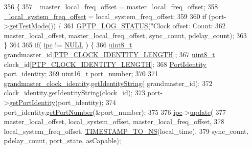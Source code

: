 \begin{DoxyCode}
356 \{
357     \hyperlink{class_i_e_e_e1588_clock_acaa18d3a0781792994fc1f34c8f43773}{\_master\_local\_freq\_offset} = master\_local\_freq\_offset;
358     \hyperlink{class_i_e_e_e1588_clock_ad28017a023b91ce56dba976677a7ce1a}{\_local\_system\_freq\_offset} = local\_system\_freq\_offset;
359 
360     \textcolor{keywordflow}{if} (port->\hyperlink{class_common_port_a98f6d8a0054a05b8e627d3f9ffc53be3}{getTestMode}()) \{
361         \hyperlink{gptp__log_8hpp_a9bcf107d6f77d335b92bbc4825ea85a3}{GPTP\_LOG\_STATUS}(\textcolor{stringliteral}{"Clock offset:%
       Count:%
362                         master\_local\_offset, master\_local\_freq\_offset, sync\_count, pdelay\_count);
363     \}
364 
365     \textcolor{keywordflow}{if}( \hyperlink{class_i_e_e_e1588_clock_afe51478e6c657301658268066e29b31f}{ipc} != \hyperlink{openavb__types__base__pub_8h_a070d2ce7b6bb7e5c05602aa8c308d0c4}{NULL} ) \{
366         \hyperlink{stdint_8h_aba7bc1797add20fe3efdf37ced1182c5}{uint8\_t} grandmaster\_id[\hyperlink{ptptypes_8hpp_afd1566058ed7927c2b790c9d4a0051ec}{PTP\_CLOCK\_IDENTITY\_LENGTH}];
367         \hyperlink{stdint_8h_aba7bc1797add20fe3efdf37ced1182c5}{uint8\_t} clock\_id[\hyperlink{ptptypes_8hpp_afd1566058ed7927c2b790c9d4a0051ec}{PTP\_CLOCK\_IDENTITY\_LENGTH}];
368         \hyperlink{class_port_identity}{PortIdentity} port\_identity;
369         uint16\_t port\_number;
370 
371         \hyperlink{class_i_e_e_e1588_clock_a4cfda330972625c998f486c38a8b1532}{grandmaster\_clock\_identity}.\hyperlink{class_clock_identity_a340cfc06879a22b087f117121c347b56}{getIdentityString}(
      grandmaster\_id);
372         \hyperlink{class_i_e_e_e1588_clock_a8f1bca06e21478283b96e81ef3ba266a}{clock\_identity}.\hyperlink{class_clock_identity_a340cfc06879a22b087f117121c347b56}{getIdentityString}(clock\_id);
373         port->\hyperlink{class_common_port_a563117781330d95f1c6aa43837b7e4ed}{getPortIdentity}(port\_identity);
374         port\_identity.\hyperlink{class_port_identity_ad9d12804c253a7c8138a4bfbe87eddba}{getPortNumber}(&port\_number);
375 
376         \hyperlink{class_i_e_e_e1588_clock_afe51478e6c657301658268066e29b31f}{ipc}->\hyperlink{class_o_s___i_p_c_a33745dd660255c4161278e3bf75387dc}{update}(
377             master\_local\_offset, local\_system\_offset, master\_local\_freq\_offset,
378             local\_system\_freq\_offset, \hyperlink{ieee1588_8hpp_a0f6cecd8adce4a7314f084f3ead49999}{TIMESTAMP\_TO\_NS}(local\_time),
379             sync\_count, pdelay\_count, port\_state, asCapable);
}
\end{DoxyCode}
